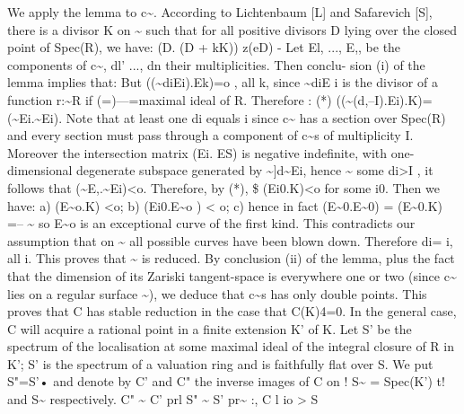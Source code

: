 \documentclass[11pt]{article}
\theoremstyle{plain}
\theoremstyle{definition}
\theoremstyle{remark}
\begin{document}
We apply the lemma to c\textasciitilde{}. According to Lichtenbaum [L] and Safarevich [S], there is a divisor K on \textasciitilde{} such that for all positive divisors D lying over the closed point of Spec(R), we have: (D. (D + kK)) z(eD) - Let El, ..., E,, be the components of c\textasciitilde{}, dl' ..., dn their multiplicities. Then conclu- sion (i) of the lemma implies that: But ((\textasciitilde{}diEi).Ek)=o , all k, since \textasciitilde{}diE i is the divisor of a function r:\textasciitilde{}R if (=)---=maximal ideal of R. Therefore : (*) ((\textasciitilde{}(d,--I).Ei).K)=(\textasciitilde{}Ei.\textasciitilde{}Ei). Note that at least one di equals i since c\textasciitilde{} has a section over Spec(R) and every section must pass through a component of c\textasciitilde{}s of multiplicity I. Moreover the intersection matrix (Ei. ES) is negative indefinite, with one-dimensional degenerate subspace generated by \textasciitilde{}]d\textasciitilde{}Ei, hence \textasciitilde{} some di>I , it follows that (\textasciitilde{}E,.\textasciitilde{}Ei)<o. Therefore, by (*), \$ (Ei0.K)<o for some i0. Then we have: a) (E\textasciitilde{}o.K) <o; b) (Ei0.E\textasciitilde{}o ) < o; c) hence in fact (E\textasciitilde{}0.E\textasciitilde{}0) = (E\textasciitilde{}0.K) =-- \textasciitilde{} so E\textasciitilde{}o is an exceptional curve of the first kind. This contradicts our assumption that on \textasciitilde{} all possible curves have been blown down. Therefore di= i, all i. This proves that \textasciitilde{} is reduced. By conclusion (ii) of the lemma, plus the fact that the dimension of its Zariski tangent-space is everywhere one or two (since c\textasciitilde{} lies on a regular surface \textasciitilde{}), we deduce that c\textasciitilde{}s has only double points. This proves that C has stable reduction in the case that C(K)4=0. In the general case, C will acquire a rational point in a finite extension K' of K. Let S' be the spectrum of the localisation at some maximal ideal of the integral closure of R in K'; S' is the spectrum of a valuation ring and is faithfully flat over S. We put S"=S'• and denote by C' and C" the inverse images of C on ! S\textasciitilde{} = Spec(K') t! and S\textasciitilde{} respectively. C" \textasciitilde{} C' prl S" \textasciitilde{} S' pr\textasciitilde{} :, C l io > S
\end{document}
